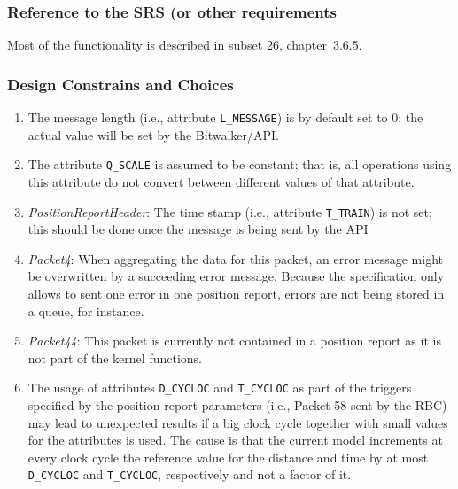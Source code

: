 \subsubsection{Reference to the SRS (or other requirements}
Most of the functionality is described in subset 26, chapter~3.6.5.

\subsubsection{Design Constrains and Choices}
\begin{enumerate}
	\item The message length (i.e., attribute \verb+L_MESSAGE+) is by default set to 0; the actual value will be set by the Bitwalker/API.
	\item The attribute \verb+Q_SCALE+ is assumed to be constant; that is, all operations using this attribute do not convert between different values of that attribute.
	\item \textit{PositionReportHeader}: The time stamp (i.e., attribute \verb+T_TRAIN+) is not set; this should be done once the message is being sent by the API
	\item \textit{Packet4}: When aggregating the data for this packet, an error message might be overwritten by a succeeding error message. Because the specification only allows to sent one error in one position report, errors are not being stored in a queue, for instance.
	\item \textit{Packet44}: This packet is currently not contained in a position report as it is not part of the kernel functions.
	\item The usage of attributes \verb+D_CYCLOC+ and \verb+T_CYCLOC+ as part of the triggers specified by the position report parameters (i.e., Packet 58 sent by the RBC) may lead to unexpected results if a big clock cycle together with small values for the attributes is used. The cause is that the current model increments at every clock cycle the reference value for the distance and time by at most \verb+D_CYCLOC+ and \verb+T_CYCLOC+, respectively and not a factor of it.
\end{enumerate}

